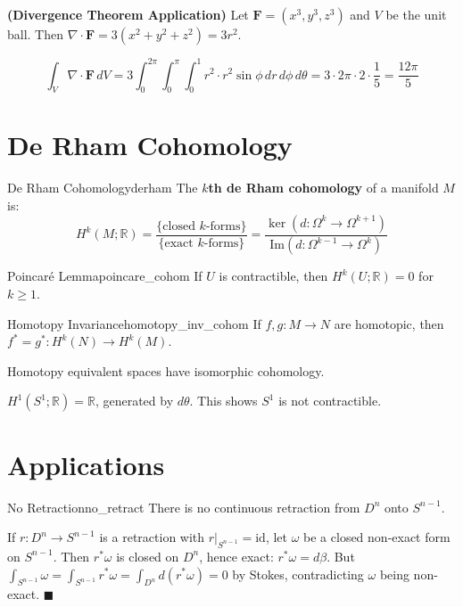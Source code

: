 \documentclass[11pt, letterpaper, openany]{book}
\renewenvironment{proof}[1][\proofname]{%
  \tcolorbox[blanker, breakable, left=1em,
    before skip=1em, after skip=1em,
    borderline west={2pt}{0pt}{MagicTeal!50},
    colback=MagicCream,
    before upper={\textcolor{MagicTeal}{\sffamily\bfseries #1.}\space}
  ]%
}{%
  \hfill\textcolor{MagicTeal}{\ensuremath{\blacksquare}}\endtcolorbox%
}
\begin{document}
\begin{example}
\textbf{(Divergence Theorem Application)}
Let $\mathbf{F} = (x^3, y^3, z^3)$ and $V$ be the unit ball. Then $\nabla \cdot \mathbf{F} = 3(x^2 + y^2 + z^2) = 3r^2$.

\[\int_V \nabla \cdot \mathbf{F}\, dV = 3\int_0^{2\pi}\int_0^\pi\int_0^1 r^2 \cdot r^2 \sin\phi\, dr\,d\phi\,d\theta = 3 \cdot 2\pi \cdot 2 \cdot \frac{1}{5} = \frac{12\pi}{5}\]
\end{example}

\section{De Rham Cohomology}

\begin{defn}{De Rham Cohomology}{derham}
The \textbf{$k$th de Rham cohomology} of a manifold $M$ is:
\[
H^k(M; \mathbb{R}) = \frac{\{\text{closed } k\text{-forms}\}}{\{\text{exact } k\text{-forms}\}} = \frac{\ker(d: \Omega^k \to \Omega^{k+1})}{\text{Im}(d: \Omega^{k-1} \to \Omega^k)}
\]
\end{defn}

\begin{thm}{Poincaré Lemma}{poincare_cohom}
If $U$ is contractible, then $H^k(U; \mathbb{R}) = 0$ for $k \geq 1$.
\end{thm}

\begin{thm}{Homotopy Invariance}{homotopy_inv_cohom}
If $f, g: M \to N$ are homotopic, then $f^* = g^*: H^k(N) \to H^k(M)$.
\end{thm}

\begin{corollary}
Homotopy equivalent spaces have isomorphic cohomology.
\end{corollary}

\begin{example}
$H^1(S^1; \mathbb{R}) = \mathbb{R}$, generated by $d\theta$. This shows $S^1$ is not contractible.
\end{example}

\section{Applications}

\begin{thm}{No Retraction}{no_retract}
There is no continuous retraction from $D^n$ onto $S^{n-1}$.
\end{thm}

\begin{proof}
If $r: D^n \to S^{n-1}$ is a retraction with $r|_{S^{n-1}} = \text{id}$, let $\omega$ be a closed non-exact form on $S^{n-1}$. Then $r^*\omega$ is closed on $D^n$, hence exact: $r^*\omega = d\beta$. But $\int_{S^{n-1}} \omega = \int_{S^{n-1}} r^*\omega = \int_{D^n} d(r^*\omega) = 0$ by Stokes, contradicting $\omega$ being non-exact.
\end{proof}
\end{document}
